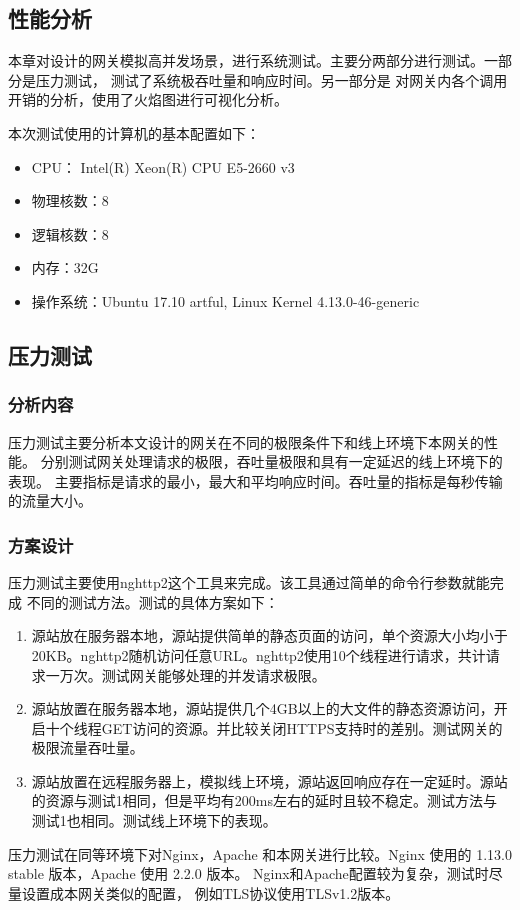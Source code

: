 \documentclass[twoside]{CUGThesis}
\begin{document}
	\begin{spacing}{2}
		\section{性能分析}
	\end{spacing}

	本章对设计的网关模拟高并发场景，进行系统测试。主要分两部分进行测试。一部分是压力测试，
	测试了系统极吞吐量和响应时间。另一部分是
	对网关内各个调用开销的分析，使用了火焰图进行可视化分析。\par 
	本次测试使用的计算机的基本配置如下：\par 
	\begin{itemize}
		\item CPU： Intel(R) Xeon(R) CPU E5-2660 v3
		\item 物理核数：8
		\item 逻辑核数：8
		\item 内存：32G
		\item 操作系统：Ubuntu 17.10 artful, Linux Kernel 4.13.0-46-generic
	\end{itemize}
	\subsection{压力测试}
	\subsubsection{分析内容}
	压力测试主要分析本文设计的网关在不同的极限条件下和线上环境下本网关的性能。
	分别测试网关处理请求的极限，吞吐量极限和具有一定延迟的线上环境下的表现。
	主要指标是请求的最小，最大和平均响应时间。吞吐量的指标是每秒传输的流量大小。
	\subsubsection{方案设计}
	压力测试主要使用nghttp2这个工具来完成。该工具通过简单的命令行参数就能完成
	不同的测试方法。测试的具体方案如下：
	\begin{enumerate}
		\item 源站放在服务器本地，源站提供简单的静态页面的访问，单个资源大小均小于20KB。nghttp2随机访问任意URL。nghttp2使用10个线程进行请求，共计请求一万次。测试网关能够处理的并发请求极限。
		\item 源站放置在服务器本地，源站提供几个4GB以上的大文件的静态资源访问，开启十个线程GET访问的资源。并比较关闭HTTPS支持时的差别。测试网关的极限流量吞吐量。
		\item 源站放置在远程服务器上，模拟线上环境，源站返回响应存在一定延时。源站的资源与测试1相同，但是平均有200ms左右的延时且较不稳定。测试方法与
		测试1也相同。测试线上环境下的表现。
	\end{enumerate}
	\par
	压力测试在同等环境下对Nginx，Apache 和本网关进行比较。Nginx 使用的 1.13.0 stable 版本，Apache 使用 2.2.0 版本。
	Nginx和Apache配置较为复杂，测试时尽量设置成本网关类似的配置，
	例如TLS协议使用TLSv1.2版本。
\end{document}
